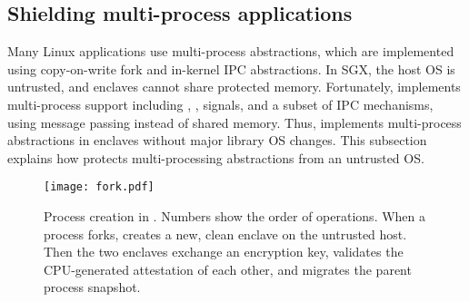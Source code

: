\subsection{Shielding multi-process applications}
\label{sec:sgx:shield:multiproc}

Many Linux applications use multi-process abstractions,
which are implemented using copy-on-write fork and in-kernel
IPC abstractions.
In SGX, the host OS is untrusted, and enclaves cannot share protected memory.
Fortunately, \graphene{} implements multi-process support
including , , signals, and a subset of IPC mechanisms,
using message passing instead of shared memory.
Thus, \graphenesgx{} implements multi-process abstractions in enclaves
without major library OS changes.
This subsection explains how
\graphenesgx{} protects
multi-processing abstractions from an untrusted OS.







\begin{figure}[t!]
\centering
\texttt{[image: fork.pdf]}
\caption{Process creation in \graphenesgx{}.
Numbers show the order of operations.
When a process forks, \graphenesgx{} creates a new, clean enclave
on the untrusted host.
Then the two enclaves %
exchange an encryption key, validates the CPU-generated attestation of each other,
and migrates the parent process snapshot.}
\label{fig:sgx:fork}
\end{figure}

